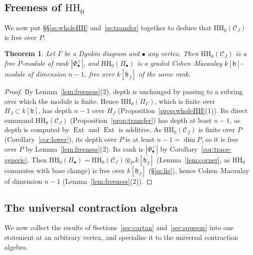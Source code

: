 \documentclass[11pt]{amsart}
\numberwithin{table}{section}
\numberwithin{figure}{section}
\numberwithin{equation}{section}
\newtheorem{thm}{Theorem}[section]
\theoremstyle{definition}
\theoremstyle{plain}
\newcommand{\cC}{\mathcal{C}}
\newcommand{\h}{\mathfrak{h}}
\newcommand{\bul}{\bullet}
\newcommand{\HH}{\mathrm{HH}}
\DeclareMathOperator{\Ext}{Ext}
\begin{document}
\subsection{\texorpdfstring{Freeness of $\HH_0$}{Freeness of HH0}}\label{ss:proofA3}

We now put \S\S\ref{ss:wholeHH} and~\ref{ss:transfer} together to deduce that $\HH_0(\cC_J)$ is free over $P$.

\begin{thm}\label{thm:squeeze}
Let $\Gamma$ be a Dynkin diagram and $\bul$ any vertex. Then $\HH_0(\cC_J)$ is a free $P$-module of rank $|\Phi^+_\bul|$, and $\HH_0(\Pi_\bul)$ is a graded Cohen--Macaulay $k[\h]$-module of dimension $n - 1$, free over $k[\h_J]$ of the same rank.
\end{thm}

\begin{proof}
By Lemma~\ref{lem:freeness}(2), depth is unchanged by passing to a subring over which the module is finite. Hence $\HH_0(\Pi_\Gamma)$, which is finite over $H_J \subset k[\h]$, has depth $n - 1$ over $H_J$ (Proposition~\ref{prop:wholeHH}(1)). Its direct summand $\HH_0(\cC_J)$ (Proposition~\ref{prop:transfer}) has depth at least $n - 1$, as depth is computed by $\Ext$ and $\Ext$ is additive. As $\HH_0(\cC_J)$ is finite over $P$ (Corollary~\ref{cor:lower}), its depth over $P$ is at least $n - 1 = \dim P$, so it is free over $P$ by Lemma~\ref{lem:freeness}(2). Its rank is $|\Phi^+_\bul|$ by Corollary~\ref{cor:trace-generic}. Then $\HH_0(\Pi_\bul) = \HH_0(\cC_J) \otimes_P k[\h_J]$ (Lemma~\ref{lem:corner}, as $\HH_0$ commutes with base change) is free over $k[\h_J]$ (\S\ref{ss:lie}), hence Cohen--Macaulay of dimension $n - 1$ (Lemma~\ref{lem:freeness}(2)).
\end{proof}


\subsection{The universal contraction algebra}\label{ss:proofA}

We now collect the results of Sections~\ref{sec:cartan} and~\ref{sec:squeeze} into one statement at an arbitrary vertex, and specialise it to the universal contraction algebra.
\end{document}
